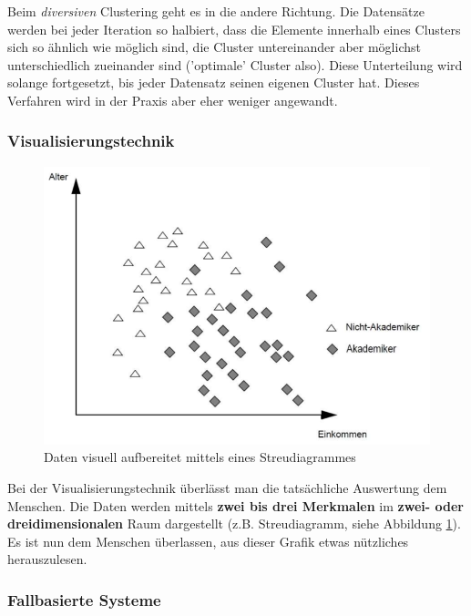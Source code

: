 \documentclass[a4paper, 11pt, nofootinbib]{article}
\begin{document}
 \vspace{10px}
 
 \noindent Beim \textit{diversiven} Clustering geht es in die andere Richtung. Die Datensätze werden bei jeder Iteration so halbiert, dass die Elemente innerhalb eines Clusters sich so ähnlich wie möglich sind, die Cluster untereinander aber möglichst unterschiedlich zueinander sind ('optimale' Cluster also). Diese Unterteilung wird solange fortgesetzt, bis jeder Datensatz seinen eigenen Cluster hat. Dieses Verfahren wird in der Praxis aber eher weniger angewandt.
 
 \subsubsection{Visualisierungstechnik}
 \begin{figure}
 	\centering
 	\includegraphics[keepaspectratio=true,height=13\baselineskip]{streudiagramm.PNG}
 	\caption{Daten visuell aufbereitet mittels eines Streudiagrammes}
 	\label{fig:streu}
 \end{figure}
 Bei der Visualisierungstechnik überlässt man die tatsächliche Auswertung dem Menschen. Die Daten werden mittels \textbf{zwei bis drei Merkmalen} im \textbf{zwei- oder dreidimensionalen} Raum dargestellt (z.B. Streudiagramm, siehe Abbildung \ref{fig:streu}). Es ist nun dem Menschen überlassen, aus dieser Grafik etwas nützliches herauszulesen.
 
 \vspace{90px}

\subsubsection{Fallbasierte Systeme}
\end{document}
